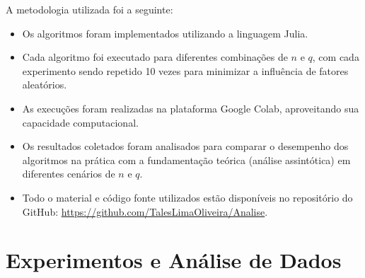 \documentclass[12pt]{article}
\begin{document}
    A metodologia utilizada foi a seguinte:
    \begin{itemize}
        \item Os algoritmos foram implementados utilizando a linguagem Julia.
    
        \item Cada algoritmo foi executado para diferentes combinações de \(n\) e \(q\), com cada experimento sendo repetido 10 vezes para minimizar a influência de fatores aleatórios.
    

        \item As execuções foram realizadas na plataforma Google Colab, aproveitando sua capacidade computacional.
    
        \item Os resultados coletados foram analisados para comparar o desempenho dos algoritmos na prática com a fundamentação teórica (análise assintótica) em diferentes cenários de \(n\) e \(q\).

        \item Todo o material e código fonte utilizados estão disponíveis no repositório do GitHub: \url{https://github.com/TalesLimaOliveira/Analise}.
    \end{itemize}
    







\section{Experimentos e Análise de Dados}
\end{document}

